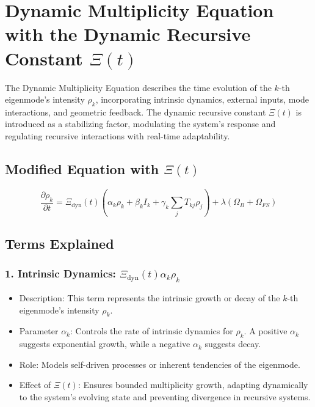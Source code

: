 \documentclass{article}
\theoremstyle{plain}
\begin{document}
\section{Dynamic Multiplicity Equation with the Dynamic Recursive Constant \(\Xi(t) \)}

The Dynamic Multiplicity Equation describes the time evolution of the \( k \)-th eigenmode’s intensity \( \rho_k \), incorporating intrinsic dynamics, external inputs, mode interactions, and geometric feedback. The dynamic recursive constant \(\Xi(t) \) is introduced as a stabilizing factor, modulating the system's response and regulating recursive interactions with real-time adaptability.

\subsection{Modified Equation with \(\Xi(t) \)}

\begin{equation}
\frac{\partial \rho_k}{\partial t} = \Xi_{\text{dyn}}(t) \left( \alpha_k \rho_k + \beta_k I_k + \gamma_k \sum_j T_{kj} \rho_j \right) + \lambda (\Omega_B + \Omega_{FS})
\end{equation}

\subsection{Terms Explained}

\subsubsection{1. Intrinsic Dynamics: \( \Xi_{\text{dyn}}(t) \alpha_k \rho_k \)}
\begin{itemize}
    \item Description: This term represents the intrinsic growth or decay of the \( k \)-th eigenmode’s intensity \( \rho_k \).
    \item Parameter \( \alpha_k \): Controls the rate of intrinsic dynamics for \( \rho_k \). A positive \( \alpha_k \) suggests exponential growth, while a negative \( \alpha_k \) suggests decay.
    \item Role: Models self-driven processes or inherent tendencies of the eigenmode.
    \item Effect of \(\Xi(t) \): Ensures bounded multiplicity growth, adapting dynamically to the system's evolving state and preventing divergence in recursive systems.
\end{itemize}
\end{document}
